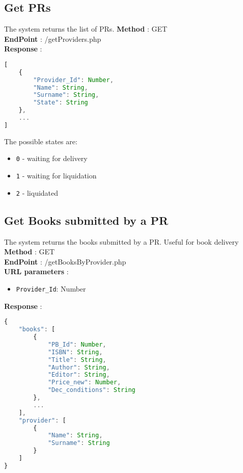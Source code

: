 \subsection{Get PRs}
The system returns the list of PRs.
\textbf{Method} : GET \\
\textbf{EndPoint} : /getProviders.php \\
\textbf{Response} :
\begin{lstlisting}[language=JavaScript, label={lst:jscode}, basicstyle=\ttfamily]
[
    {
        "Provider_Id": Number,
        "Name": String,
        "Surname": String,
        "State": String
    },
    ...
]
\end{lstlisting}
The possible states are:
\begin{itemize}
    \item \texttt{0} - waiting for delivery
    \item \texttt{1} - waiting for liquidation
    \item \texttt{2} - liquidated
\end{itemize}

\subsection{Get Books submitted by a PR}
The system returns the books submitted by a PR. Useful for book delivery\\
\textbf{Method} : GET \\
\textbf{EndPoint} : /getBooksByProvider.php \\
\textbf{URL parameters} :
\begin{itemize}
    \item \texttt{Provider\_Id}: Number
\end{itemize}
\textbf{Response} :
\begin{lstlisting}[language=JavaScript, label={lst:jscode}, basicstyle=\ttfamily]
{
    "books": [
        {
            "PB_Id": Number,
            "ISBN": String,
            "Title": String,
            "Author": String,
            "Editor": String,
            "Price_new": Number,
            "Dec_conditions": String
        },
        ...
    ],
    "provider": [
        {
            "Name": String,
            "Surname": String
        }
    ]
}
\end{lstlisting}

